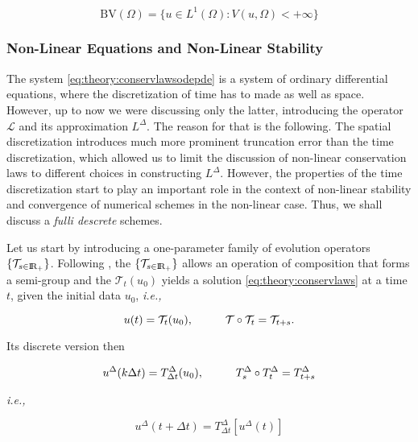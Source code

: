 \begin{equation}
\text{BV}(\Omega) = \{u\in L^1(\Omega): V(u, \Omega) < +\infty\}
\end{equation}


\subsubsection{Non-Linear Equations and Non-Linear Stability}


The system \ref{eq:theory:conservlawsodepde} is a system of ordinary differential equations, where the discretization of time has to made as well as space. 
However, up to now we were discussing only the latter, introducing the operator $\mathcal{L}$ and its approximation $L^{\Delta}$. 
The reason for that is the following. The spatial discretization introduces much more prominent truncation error than the time discretization, which allowed us to limit the discussion of non-linear conservation laws to different choices in constructing $L^{\Delta}$. 
However, the properties of the time discretization start to play an important role in the context of non-linear stability and convergence of numerical schemes in the non-linear case. 
Thus, we shall discuss a \textit{fulli descrete} schemes.

Let us start by introducing a one-parameter family of evolution operators $\{\mathcal{T}_{s\in\text{I\!R}_+}\}$. 
Following \cite{Kruzkov:1970}, the $\{\mathcal{T}_{s\in\text{I\!R}_+}\}$ allows an operation of composition that forms a semi-group and the $\mathcal{T}_t(u_0)$ yields a solution \ref{eq:theory:conservlaws} at a time $t$, given the initial data $u_0$, \textit{i.e.,}

\begin{equation}
u(t) = \mathcal{T}_t(u_0), \hspace{10mm} \mathcal{T}\circ\mathcal{T}_t = \mathcal{T}_{t+s}.
\end{equation}

Its discrete version then

\begin{equation}
u^{\Delta}(k\Delta t) = T^{\Delta}_{\Delta t}(u_0), \hspace{10mm} T^{\Delta}_s\circ T^{\Delta}_t = T^{\Delta} _{t+s}
\end{equation}

\textit{i.e.,}

\begin{equation}
u^{\Delta}(t+\Delta t) = T^{\Delta} _{\Delta t}[u^{\Delta}(t)]
\end{equation}

